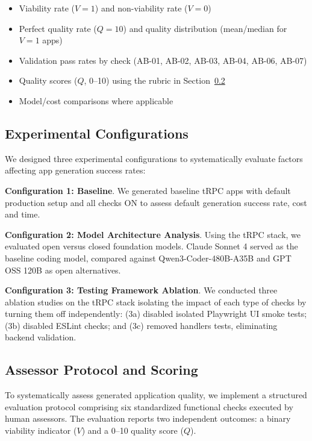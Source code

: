 \documentclass[conference]{IEEEtran}
\begin{document}
\begin{itemize}
\item Viability rate ($V=1$) and non-viability rate ($V=0$)
\item Perfect quality rate ($Q=10$) and quality distribution (mean/median for $V=1$ apps)
\item Validation pass rates by check (AB-01, AB-02, AB-03, AB-04, AB-06, AB-07)
\item Quality scores ($Q$, 0--10) using the rubric in Section~\ref{sec:scoring}
\item Model/cost comparisons where applicable
\end{itemize}

\subsection{Experimental Configurations}

We designed three experimental configurations to systematically evaluate factors affecting app generation success rates:

\textbf{Configuration 1: Baseline}. We generated baseline tRPC apps with default production setup and all checks ON to assess default generation success rate, cost and time.

\textbf{Configuration 2: Model Architecture Analysis}. Using the tRPC stack, we evaluated open versus closed foundation models. Claude Sonnet 4 served as the baseline coding model, compared against Qwen3-Coder-480B-A35B \cite{qwen2025qwen3} and GPT OSS 120B \cite{openai2025gpt} as open alternatives.

\textbf{Configuration 3: Testing Framework Ablation}. We conducted three ablation studies on the tRPC stack isolating the impact of each type of checks by turning them off independently: (3a) disabled isolated Playwright UI smoke tests; (3b) disabled ESLint checks; and (3c) removed handlers tests, eliminating backend validation.

\subsection{Assessor Protocol and Scoring}
\label{sec:scoring}

To systematically assess generated application quality, we implement a structured evaluation protocol comprising six standardized functional checks executed by human assessors. The evaluation reports two independent outcomes: a binary viability indicator ($V$) and a 0--10 quality score ($Q$).
\end{document}
